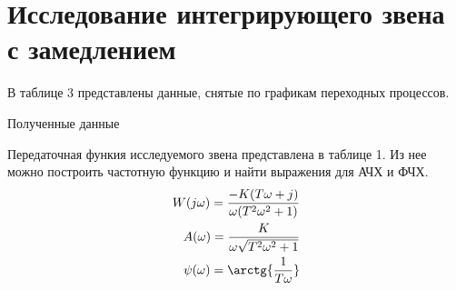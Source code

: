 \documentclass[a4paper, 11pt]{article}
\begin{document}
\newpage
\section{Исследование интегрирующего звена с замедлением}

В таблице 3 представлены данные, снятые по графикам переходных процессов. \par
\begin{table}[h!]
    \centering
    \begin{threeparttable}
        \caption{Полученные данные} \label{tab:perflogcross}
    \end{threeparttable}
\end{table}
Передаточная функия исследуемого звена представлена в таблице 1. Из нее можно построить частотную функцию и найти выражения для АЧХ и ФЧХ.
\begin{align}
    W(j\omega) = \frac{-K(T\omega + j)}{\omega(T^2\omega^2 + 1)} \\
    A(\omega) = \frac{K}{\omega\sqrt{T^2\omega^2 + 1}} \\
    \psi(\omega) = \arctg{\frac{1}{T\omega}}
\end{align}
\end{document}
